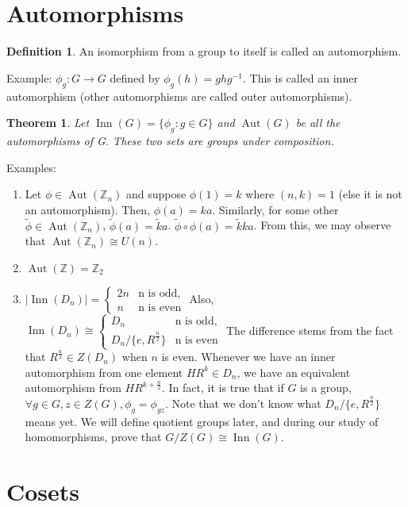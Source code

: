 \documentclass{article}
\theoremstyle{definition}
\newtheorem{definition}{Definition}
\theoremstyle{plain}
\newtheorem{theorem}{Theorem}
\theoremstyle{corollary}
\theoremstyle{lemma}
\DeclareMathOperator{\Inn}{Inn}
\DeclareMathOperator{\Aut}{Aut}
\begin{document}
\section{Automorphisms}

\begin{definition}
An isomorphism from a group to itself is called an automorphism.
\end{definition}
Example: $\phi_g:G\rightarrow G$ defined by $\phi_g(h)=ghg^{-1}$. This is called an inner automorphism (other automorphisms are called outer automorphisms).

\begin{theorem}
    Let $\Inn(G)=\{\phi_g:g\in G\}$ and $\Aut(G)$ be all the automorphisms of G. These two sets are groups under composition.
\end{theorem}
Examples:
\begin{enumerate}
    \item Let $\phi\in\Aut(\mathbb{Z}_n)$ and suppose $\phi(1)=k$ where $(n,k)=1$ (else it is not an automorphism). Then, $\phi(a)=ka$. Similarly, for some other $\tilde{\phi}\in\Aut(\mathbb{Z}_n)$, $\tilde{\phi}(a)=\tilde{k}a$. $\tilde{\phi}\circ\phi(a)=\tilde{k}ka$. From this, we may observe that $\Aut(\mathbb{Z}_n)\cong U(n)$.
    \item $\Aut(\mathbb{Z})=\mathbb{Z}_2$
    \item $|\Inn(D_n)|=\begin{cases}
        2n & \text{n is odd,}\\
        n  & \text{n is even}
    \end{cases}$ Also, $\Inn(D_n)\cong\begin{cases}
        D_n & \text{n is odd,}\\
        D_n/\{e,R^{\frac n 2}\}  & \text{n is even}
    \end{cases}$
    The difference stems from the fact that $R^{\frac n 2}\in Z(D_n)$ when $n$ is even. Whenever we have an inner automorphism from one element $HR^k\in D_n$, we have an equivalent automorphism from $HR^{k+\frac n 2}$. In fact, it is true that if $G$ is a group, $\forall g\in G,z\in Z(G), \phi_g=\phi_{gz}$.
    Note that we don't know what $D_n/\{e,R^{\frac n 2}\}$ means yet. We will define quotient groups later, and during our study of homomorphisms, prove that $G/Z(G)\cong \Inn(G)$.
\end{enumerate}

\section{Cosets}
\end{document}

